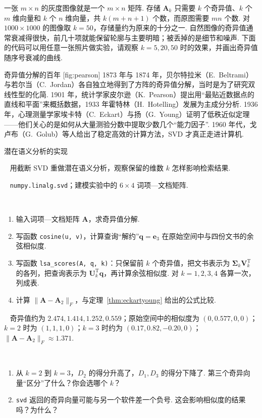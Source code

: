 \documentclass[lang=cn,10.5pt,scheme=chinese,toc=twocol,section,chinesefont=nofont,
twoside,citestyle=gb7714-2015,bibstyle=gb7714-2015]{elegantbook}
\DeclareRobustCommand{\textbf}[1]{{\lnsemiboldlatin\lnsemiboldcjk #1}}
\newcommand{\vv}[1]{\boldsymbol{#1}}
\newcommand{\trans}{\mathrm{T}}             %
\numberwithin{equation}{section}   %
\newcommand{\mstep}[1]{\par\smallskip\noindent\textbf{【#1】}\ }
\begin{document}
一张 $m\times n$ 的灰度图像就是一个 $m\times n$ 矩阵. 存储 $\vv A_k$ 只需要 $k$ 个奇异值、$k$ 个 $m$ 维向量和 $k$ 个 $n$ 维向量，共 $k(m+n+1)$ 个数，而原图需要 $mn$ 个数. 对 $1000\times1000$ 的图像取 $k=50$，存储量约为原来的十分之一. 自然图像的奇异值通常衰减得很快，前几十项就能保留轮廓与主要明暗；被丢掉的是细节和噪声. 下面的代码可以用任意一张照片做实验，请观察 $k=5,20,50$ 时的效果，并画出奇异值随序号衰减的曲线.

\begin{historybox}{奇异值分解的百年}
  [fig:pearson]
  1873 年与 1874 年，贝尔特拉米（E.~Beltrami）与若尔当（C.~Jordan）各自独立地得到了方阵的奇异值分解，当时是为了研究双线性型的化简\cite{beltrami1873funzioni,jordan1874memoire,stewart1993early}. 1901 年，统计学家皮尔逊（K.~Pearson）提出用“最贴近数据点的直线和平面”来概括数据\cite{pearson1901lines}，1933 年霍特林（H.~Hotelling）发展为主成分分析\cite{hotelling1933analysis}. 1936 年，心理测量学家埃卡特（C.~Eckart）与扬（G.~Young）证明了低秩近似定理——他们关心的是如何从大量测验分数中提取少数几个“能力因子”\cite{eckart1936approximation}. 1960 年代，戈卢布（G.~Golub）等人给出了稳定高效的计算方法，SVD 才真正走进计算机\cite{golub1965calculating}.
\end{historybox}

\begin{codebox}{潜在语义分析的实现}
  \mstep{目标} 用截断 SVD 重做潜在语义分析，观察保留的维数 $k$ 怎样影响检索结果.

  \mstep{准备} \texttt{numpy.linalg.svd}；建模实验中的 $6\times4$ 词项—文档矩阵.

  \mstep{任务}
  \begin{enumerate}
    \item 输入词项—文档矩阵 $\vv A$，求奇异值分解.
    \item 写函数 \texttt{cosine(u, v)}，计算查询“解约”$\vv q=\vv e_3$ 在原始空间中与四份文书的余弦相似度.
    \item 写函数 \texttt{lsa\_scores(A, q, k)}：只保留前 $k$ 个奇异值，把文书表示为 $\vv\Sigma_k\vv V_k^\trans$ 的各列，把查询表示为 $\vv U_k^\trans\vv q$，再计算余弦相似度. 对 $k=1,2,3,4$ 各算一次，列成表.
    \item 计算 $\|\vv A-\vv A_2\|_F$，与定理~\ref{thm:eckartyoung} 给出的公式比较.
  \end{enumerate}

  \mstep{检查点} 奇异值约为 $2.474,1.414,1.252,0.559$；原始空间中的相似度为 $(0,0.577,0,0)$；$k=2$ 时为 $(1,1,1,0)$；$k=3$ 时约为 $(0.17,0.82,-0.20,0)$；$\|\vv A-\vv A_2\|_F\approx1.371$.

  \mstep{思考}
  \begin{enumerate}
    \item 从 $k=2$ 到 $k=3$，$D_2$ 的得分升高了，$D_1,D_3$ 的得分下降了. 第三个奇异向量“区分”了什么？你会选哪个 $k$？
    \item \texttt{svd} 返回的奇异向量可能与另一个软件差一个负号. 这会影响相似度的结果吗？为什么？
  \end{enumerate}
\end{codebox}
\end{document}
